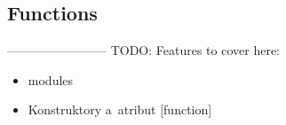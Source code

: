 \documentclass{fithesis3}
\begin{document}
\subsection{Functions}



------------------------
TODO: Features to cover here:
\begin{itemize}
\item modules
\item Konstruktory a~atribut [function]
\end{itemize}















%
%
\end{document}
